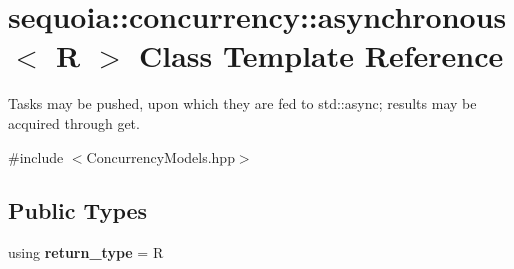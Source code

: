 \hypertarget{classsequoia_1_1concurrency_1_1asynchronous}{}\section{sequoia\+::concurrency\+::asynchronous$<$ R $>$ Class Template Reference}
\label{classsequoia_1_1concurrency_1_1asynchronous}


Tasks may be pushed, upon which they are fed to std\+::async; results may be acquired through get.  




{\ttfamily \#include $<$Concurrency\+Models.\+hpp$>$}

\subsection*{Public Types}
\begin{DoxyCompactItemize}
\item 
\mbox{\label{classsequoia_1_1concurrency_1_1asynchronous_a2571ea52900b9eec28fc8df79035d044}} 
using {\bfseries return\+\_\+type} = R
\end{DoxyCompactItemize}
